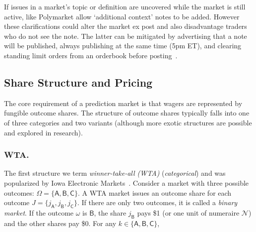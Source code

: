 If issues in a market's topic or definition are uncovered while the market is still active, \depms like Polymarket allow `additional context' notes to be added. However these clarifications could alter the market ex post and also disadvantage traders who do not see the note. The latter can be mitigated by advertising that a note will be published, always publishing at the same time (\eg 5pm ET), and clearing standing limit orders from an orderbook before posting~\cite{poly}.




\subsection{Share Structure and Pricing}\label{wf:mech}\label{wf:price}

The core requirement of a prediction market is that wagers are represented by fungible outcome shares. The structure of outcome shares typically falls into one of three categories and two variants (although more exotic structures are possible and explored in research). 

\subsubsection{WTA.}

The first structure we term \textit{winner-take-all (WTA)} (\aka \textit{categorical}) and was popularized by Iowa Electronic Markets~\cite{iem}. Consider a market with three possible outcomes: $\Omega=\{\mathsf{A}, \mathsf{B}, \mathsf{C}\}$.  A WTA market issues an outcome share for each outcome $J=\{j_\mathsf{A}, j_\mathsf{B}, j_\mathsf{C}\}$. If there are only two outcomes, it is called a \textit{binary market}. If the outcome $\omega$ is $\mathsf{B}$, the share $j_\mathsf{B}$ pays \$1 (or one unit of numeraire $\mathcal{N}$) and the other shares pay \$0.  For any $k\in\{\mathsf{A},\mathsf{B},\mathsf{C}\}$,

